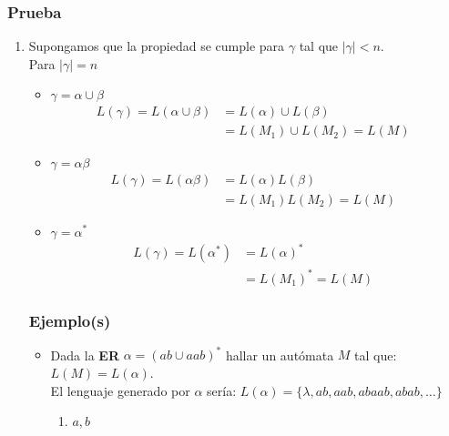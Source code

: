\subsubsection*{Prueba}
\begin{enumerate}
\item Supongamos que la propiedad se cumple para $\gamma$ tal que $|\gamma| < n$.\\${ }$\\ Para $|\gamma|=n$
\begin{itemize}
\item $\gamma=\alpha\cup\beta$
\begin{align*}
L(\gamma) = L(\alpha\cup\beta)&= L(\alpha)\cup L(\beta) & \\
	                       &= L(M_1)\cup L(M_2)      =L(M)
\end{align*}
\item $\gamma=\alpha\beta$
\begin{align*}
L(\gamma) = L(\alpha\beta)&= L(\alpha) L(\beta) & \\
	                       &= L(M_1) L(M_2)      =L(M)
\end{align*}
\item $\gamma=\alpha^*$
\begin{align*}
L(\gamma) = L(\alpha^*)&= L(\alpha)^* & \\
	                       &= L(M_1)^*      =L(M)
\end{align*}
\end{itemize}

\subsubsection{Ejemplo(s)}
\begin{itemize}
\item Dada la \textbf{ER} $\alpha = (ab \cup aab)^*$ hallar un autómata $M$ tal que: $L(M) = L(\alpha)$. \\${ }$\\
El lenguaje generado por $\alpha$ sería: $L(\alpha) =\{ \lambda,ab,aab,abaab,abab,\ldots \}$
\begin{enumerate}[label=\textbf{Paso} \arabic*:]
\item $a,b$
\begin{center}
\end{center}
\end{enumerate}
\end{itemize}
\end{enumerate}
